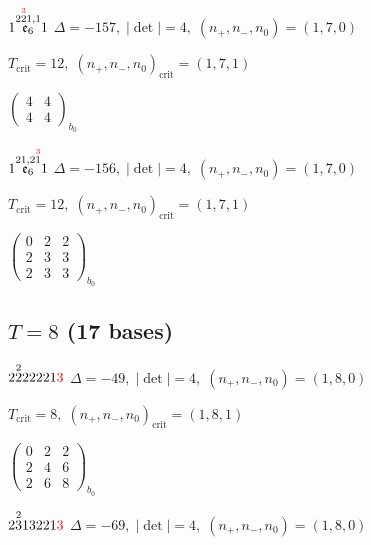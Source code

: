 \documentclass[10pt]{article}
\begin{document}
\smallskip

$1\overset{2\overset{\textcolor{red}{3}}{2}1,1}{\mathfrak{e}_6}1$ \quad $\Delta=-157,\; |\det|=4,\; (n_+,n_-,n_0)=(1,7,0)$

\hspace{1em}$T_{\text{crit}}=12,\; (n_+,n_-,n_0)_{\text{crit}}=(1,7,1)$

\hspace{2em}$\left(\begin{smallmatrix}4 & 4 \\ 4 & 4\end{smallmatrix}\right)_{\!b_0}$

\smallskip

$1\overset{21,2\overset{\textcolor{red}{3}}{1}}{\mathfrak{e}_6}1$ \quad $\Delta=-156,\; |\det|=4,\; (n_+,n_-,n_0)=(1,7,0)$

\hspace{1em}$T_{\text{crit}}=12,\; (n_+,n_-,n_0)_{\text{crit}}=(1,7,1)$

\hspace{2em}$\left(\begin{smallmatrix}0 & 2 & 2 \\ 2 & 3 & 3 \\ 2 & 3 & 3\end{smallmatrix}\right)_{\!b_0}$


\subsection*{$T = 8$ \quad (17 bases)}
\smallskip

$2\overset{2}{2}22221\textcolor{red}{3}$ \quad $\Delta=-49,\; |\det|=4,\; (n_+,n_-,n_0)=(1,8,0)$

\hspace{1em}$T_{\text{crit}}=8,\; (n_+,n_-,n_0)_{\text{crit}}=(1,8,1)$

\hspace{2em}$\left(\begin{smallmatrix}0 & 2 & 2 \\ 2 & 4 & 6 \\ 2 & 6 & 8\end{smallmatrix}\right)_{\!b_0}$

\smallskip

$2\overset{2}{3}13221\textcolor{red}{3}$ \quad $\Delta=-69,\; |\det|=4,\; (n_+,n_-,n_0)=(1,8,0)$
\end{document}
